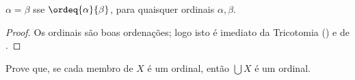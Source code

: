 \documentclass[../../../include/open-logic-section]{subfiles}
\begin{document}
\begin{prop}
$\alpha = \beta$ sse $\ordeq{\alpha}{\beta}$, para quaisquer ordinais
$\alpha, \beta$.
\end{prop}

\begin{proof}
Os ordinais são boas ordenações; logo isto é imediato da Tricotomia
() e de
. 
\end{proof}

\begin{prob}
Prove que, se cada membro de $X$ é um ordinal, então $\bigcup X$ é um ordinal.
\end{prob}
\end{document}
